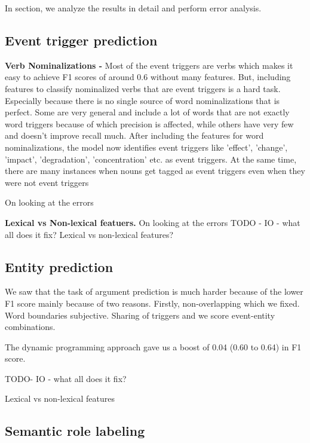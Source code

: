 In section, we analyze the results in detail and perform error analysis.

\subsection{Event trigger prediction}
{\bf Verb Nominalizations -} Most of the event triggers are verbs which makes it easy to achieve F1 scores of around 0.6 without many features. But, including features to classify nominalized verbs that are event triggers is a hard task. Especially because there is no single source of word nominalizations that is perfect. Some are very general and include a lot of words that are not exactly word triggers because of which precision is affected, while others have very few and doesn't improve recall much. After including the features for word nominalizations, the model now identifies event triggers like 'effect', 'change', 'impact', 'degradation', 'concentration' etc. as event triggers. At the same time, there are many instances when nouns get tagged as event triggers even when they were not event triggers

{\bf }On looking at the errors 

{\bf Lexical vs Non-lexical featuers.} On looking at the errors 
TODO - IO - what all does it fix? Lexical vs non-lexical features?

\subsection{Entity prediction}

We saw that the task of argument prediction is much harder because of the lower F1 score mainly because of two reasons. Firstly, non-overlapping which we fixed. Word boundaries subjective. Sharing of triggers and we score event-entity combinations.

The dynamic programming approach gave us a boost of 0.04 (0.60 to 0.64) in F1 score. 

TODO- IO - what all does it fix?

Lexical vs non-lexical features

\subsection{Semantic role labeling}